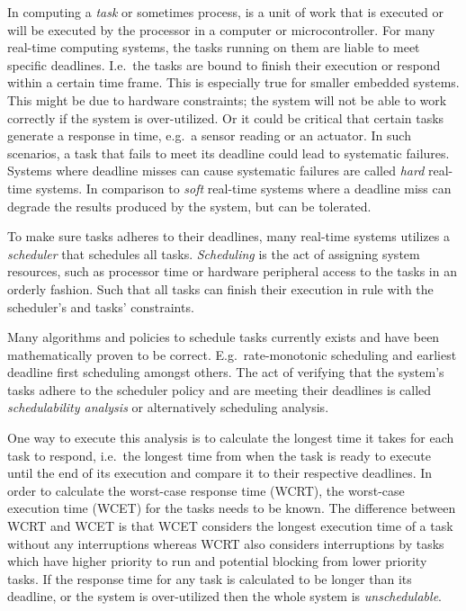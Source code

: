 In computing a \emph{task} or sometimes process, is a unit of work that is
executed or will be executed by the processor in a computer or microcontroller.
For many real-time computing systems, the tasks running on them are liable to
meet specific deadlines. I.e.\ the tasks are bound to finish their execution or
respond within a certain time frame. This is especially true for smaller
embedded systems. This might be due to hardware constraints; the system will
not be able to work correctly if the system is over-utilized. Or it could be
critical that certain tasks generate a response in time, e.g.\ a sensor reading
or an actuator. In such scenarios, a task that fails to meet its deadline could
lead to systematic failures. Systems where deadline misses can cause systematic
failures are called \emph{hard} real-time systems. In comparison to \emph{soft}
real-time systems where a deadline miss can degrade the results produced by the
system, but can be tolerated.

To make sure tasks adheres to their deadlines, many real-time systems utilizes
a \emph{scheduler} that schedules all tasks. \emph{Scheduling} is the act of
assigning system resources, such as processor time or hardware peripheral
access to the tasks in an orderly fashion. Such that all tasks can finish their
execution in rule with the scheduler's and tasks' constraints.

Many algorithms and policies to schedule tasks currently exists and have been
mathematically proven to be correct.  E.g.\ rate-monotonic
scheduling\cite{ratemonotonic} and earliest deadline first scheduling\cite{edf}
amongst others.  The act of verifying that the system's tasks adhere to the
scheduler policy and are meeting their deadlines is called \emph{schedulability
analysis} or alternatively scheduling analysis.

One way to execute this analysis is to calculate the longest time it takes for
each task to respond, i.e.\ the longest time from when the task is ready to
execute until the end of its execution and compare it to their respective
deadlines.  In order to calculate the worst-case response time (WCRT), the
worst-case execution time (WCET) for the tasks needs to be known. The
difference between WCRT and WCET is that WCET considers the longest execution
time of a task without any interruptions whereas WCRT also considers
interruptions by tasks which have higher priority to
run and potential blocking from lower priority
tasks\cite{hardrealtimecomputingsystems}. If the response time for any task is
calculated to be longer than its deadline, or the system is over-utilized then
the whole system is \emph{unschedulable}.

